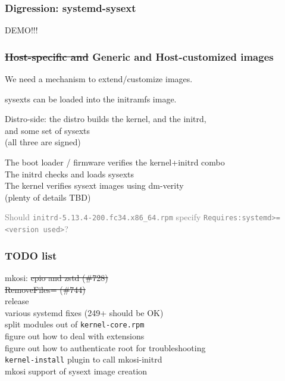 \documentclass[]{beamer}
\begin{document}
\begin{frame}
  \frametitle{Digression: systemd-sysext}

  DEMO!!!

\end{frame}

\begin{frame}
  \frametitle{\sout{Host-specific and }Generic and Host-customized images}

  We need a mechanism to extend/customize images.

  \bigskip
  \pause

  sysexts can be loaded into the initramfs image.

  \bigskip
  \pause

  Distro-side: the distro builds the kernel, and the initrd,\\
  \phantom{Distro-side: }and some set of sysexts\\
  \phantom{Distro-side: }(all three are signed)\\

  \pause

  The boot loader / firmware verifies the kernel+initrd combo\\
  The initrd checks and loads sysexts\\
  The kernel verifies sysext images using dm-verity\\
  (plenty of details TBD)

  \vfill

  \textcolor{gray}{Should \texttt{initrd-5.13.4-200.fc34.x86\_64.rpm} specify \texttt{Requires:systemd>=<version used>}?}
\end{frame}

\begin{frame}
  \frametitle{TODO list}

  mkosi: \sout{cpio and zstd (\#728)}\\
  \phantom{mkosi: }\sout{RemoveFiles= (\#744)}\\
  \phantom{mkosi: }release\\

  various systemd fixes (249+ should be OK)\\

  split modules out of \texttt{kernel-core.rpm}\\

  figure out how to deal with extensions\\
  figure out how to authenticate root for troubleshooting\\

  \texttt{kernel-install} plugin to call mkosi-initrd\\

  mkosi support of sysext image creation
\end{frame}
\end{document}
